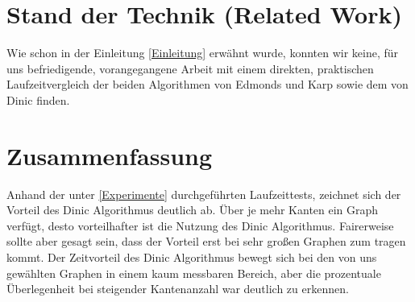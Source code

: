 \documentclass[a4paper]{llncs}
\begin{document}
\section{Stand der Technik (Related Work)}
\label{Related Work}
Wie schon in der Einleitung \ref{Einleitung} erwähnt wurde, konnten wir keine, für uns befriedigende, vorangegangene Arbeit mit einem direkten, praktischen Laufzeitvergleich der beiden Algorithmen von Edmonds und Karp sowie dem von Dinic finden.

\section{Zusammenfassung}
\label{Zusammenfassung}
Anhand der unter \ref{Experimente} durchgeführten Laufzeittests, zeichnet sich der Vorteil des Dinic Algorithmus deutlich ab. Über je mehr Kanten ein Graph verfügt, desto vorteilhafter ist die Nutzung des Dinic Algorithmus. Fairerweise sollte aber gesagt sein, dass der Vorteil erst bei sehr großen Graphen zum tragen kommt. Der Zeitvorteil des Dinic Algorithmus bewegt sich bei den von uns gewählten Graphen in einem kaum messbaren Bereich, aber die prozentuale Überlegenheit bei steigender Kantenanzahl war deutlich zu erkennen.  


 
\end{document}
